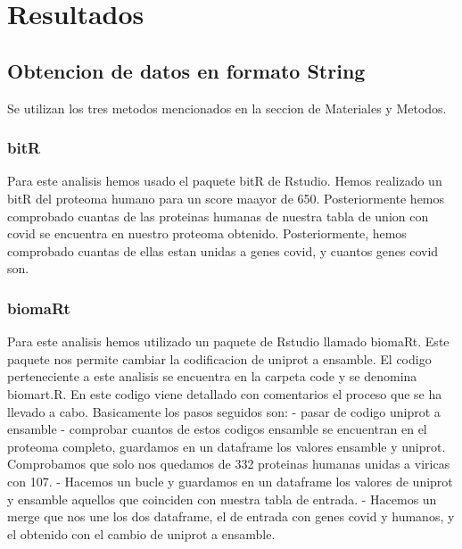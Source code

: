 
\section{Resultados}

\subsection{Obtencion de datos en formato String}
Se utilizan los tres metodos mencionados en la seccion de Materiales y Metodos.

\subsubsection{bitR}
Para este analisis hemos usado el paquete bitR de Rstudio. Hemos realizado un bitR del proteoma humano para un score maayor de 650. Posteriormente hemos comprobado cuantas de las proteinas humanas de nuestra tabla de union con covid se encuentra en nuestro proteoma obtenido. Posteriormente, hemos comprobado cuantas de ellas estan unidas a genes covid, y cuantos genes covid son.

\subsubsection{biomaRt}
Para este analisis hemos utilizado un paquete de Rstudio llamado biomaRt. Este paquete nos permite cambiar la codificacion de uniprot a ensamble.
El codigo perteneciente a este analisis se encuentra en la carpeta code y se denomina biomart.R. En este codigo viene detallado con comentarios el
proceso que se ha llevado a cabo. Basicamente los pasos seguidos son: 
- pasar de codigo uniprot a ensamble
- comprobar cuantos de estos codigos ensamble se encuentran en el proteoma completo, guardamos en un dataframe los valores ensamble y uniprot.  Comprobamos que solo nos quedamos de 332 proteinas humanas unidas a viricas con 107.
- Hacemos un bucle y guardamos en un dataframe los valores de uniprot y ensamble aquellos que coinciden con nuestra tabla de entrada.
- Hacemos un merge que nos une los dos dataframe, el de entrada con genes covid y humanos, y el obtenido con el cambio de uniprot a ensamble. 



